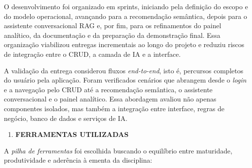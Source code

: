 \documentclass[
]{article}
\begin{document}
O desenvolvimento foi organizado em sprints, iniciando pela definição do
escopo e do modelo operacional, avançando para a recomendação semântica,
depois para o assistente conversacional RAG e, por fim, para os
refinamentos do painel analítico, da documentação e da preparação da
demonstração final. Essa organização viabilizou entregas incrementais ao
longo do projeto e reduziu riscos de integração entre o CRUD, a camada
de IA e a interface.

A validação da entrega considerou fluxos \emph{end-to-end}, isto é,
percursos completos do usuário pela aplicação. Foram verificados
cenários que abrangem desde o \emph{login} e a navegação pelo CRUD até a
recomendação semântica, o assistente conversacional e o painel
analítico. Essa abordagem avaliou não apenas componentes isolados, mas
também a integração entre interface, regras de negócio, banco de dados e
serviços de IA.

\begin{enumerate}
\def\labelenumi{\arabic{enumi}.}
\setcounter{enumi}{8}
\item
  \protect{}\label{_Toc230227832}{}\textbf{FERRAMENTAS
  UTILIZADAS}
\end{enumerate}

A \emph{pilha de ferramentas} foi escolhida buscando o equilíbrio entre
maturidade, produtividade e aderência à ementa da disciplina:
\end{document}
